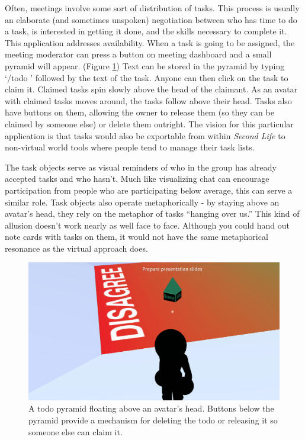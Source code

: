 Often, meetings involve some sort of distribution of tasks. This process is usually an elaborate (and sometimes unspoken) negotiation between who has time to do a task, is interested in getting it done, and the skills necessary to complete it. This application addresses availability. When a task is going to be assigned, the meeting moderator can press a button on meeting dashboard and a small pyramid will appear. (Figure \ref{fig:information_space_todo}) Text can be stored in the pyramid by typing `/todo ' followed by the text of the task. Anyone can then click on the task to claim it. Claimed tasks spin slowly above the head of the claimant. As an avatar with claimed tasks moves around, the tasks follow above their head. Tasks also have buttons on them, allowing the owner to release them (so they can be claimed by someone else) or delete them outright. The vision for this particular application is that tasks would also be exportable from within \emph{Second Life} to non-virtual world tools where people tend to manage their task lists.

The task objects serve as visual reminders of who in the group has already accepted tasks and who hasn't. Much like visualizing chat can encourage participation from people who are participating below average, this can serve a similar role. Task objects also operate metaphorically - by staying above an avatar's head, they rely on the metaphor of tasks ``hanging over us.'' \citep{lakoff_metaphors_1980} This kind of allusion doesn't work nearly as well face to face. Although you could hand out note cards with tasks on them, it would not have the same metaphorical resonance as the virtual approach does.


\begin{figure}[tp]
	\includegraphics{figures/todo.png}
	\caption{A todo pyramid floating above an avatar's head. Buttons below the pyramid provide a mechanism for deleting the todo or releasing it so someone else can claim it.}
	\label{fig:information_space_todo}
\end{figure}


